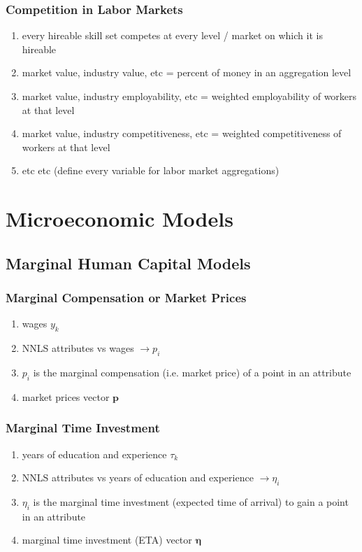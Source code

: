 \documentclass{elsarticle} %
\begin{document}
\subsubsection{Competition in Labor Markets}
\begin{enumerate}
    \item every hireable skill set competes at every level / market on which it is
          hireable
    \item market value, industry value, etc = percent of money in an aggregation level
    \item market value, industry employability, etc = weighted employability of workers
          at that level
    \item market value, industry competitiveness, etc = weighted competitiveness of
          workers at that level
    \item etc etc (define every variable for labor market aggregations)
\end{enumerate}


\section{Microeconomic Models}
\subsection{Marginal Human Capital Models}
\subsubsection{Marginal Compensation or Market Prices}
\begin{enumerate}
    \item wages $y_k$
    \item NNLS attributes vs wages $\rightarrow p_i$
    \item $p_i$ is the marginal compensation (i.e. market price) of a point in an attribute
    \item market prices vector $\textbf{p}$
\end{enumerate}

\subsubsection{Marginal Time Investment}
\begin{enumerate}
    \item years of education and experience $\tau_k$
    \item NNLS attributes vs years of education and experience $\rightarrow \eta_i$
    \item $\eta_i$ is the marginal time investment (expected time of arrival) to gain a point in an attribute
    \item marginal time investment (ETA) vector $\boldsymbol{\eta}$
\end{enumerate}
\end{document}
